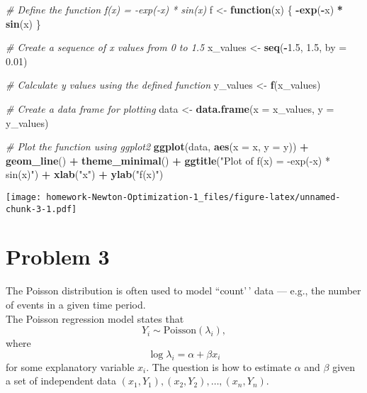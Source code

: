 \documentclass[
]{article}
\newenvironment{Shaded}{\begin{snugshade}}{\end{snugshade}}
\newcommand{\AttributeTok}[1]{\textcolor[rgb]{0.13,0.29,0.53}{#1}}
\newcommand{\CommentTok}[1]{\textcolor[rgb]{0.56,0.35,0.01}{\textit{#1}}}
\newcommand{\ControlFlowTok}[1]{\textcolor[rgb]{0.13,0.29,0.53}{\textbf{#1}}}
\newcommand{\FloatTok}[1]{\textcolor[rgb]{0.00,0.00,0.81}{#1}}
\newcommand{\FunctionTok}[1]{\textcolor[rgb]{0.13,0.29,0.53}{\textbf{#1}}}
\newcommand{\NormalTok}[1]{#1}
\newcommand{\OtherTok}[1]{\textcolor[rgb]{0.56,0.35,0.01}{#1}}
\newcommand{\SpecialCharTok}[1]{\textcolor[rgb]{0.81,0.36,0.00}{\textbf{#1}}}
\newcommand{\StringTok}[1]{\textcolor[rgb]{0.31,0.60,0.02}{#1}}
\begin{document}
\begin{Shaded}
\begin{Highlighting}[]
\CommentTok{\# Define the function f(x) = {-}exp({-}x) * sin(x)}
\NormalTok{f }\OtherTok{\textless{}{-}} \ControlFlowTok{function}\NormalTok{(x) \{}
  \SpecialCharTok{{-}}\FunctionTok{exp}\NormalTok{(}\SpecialCharTok{{-}}\NormalTok{x) }\SpecialCharTok{*} \FunctionTok{sin}\NormalTok{(x)}
\NormalTok{\}}

\CommentTok{\# Create a sequence of x values from 0 to 1.5}
\NormalTok{x\_values }\OtherTok{\textless{}{-}} \FunctionTok{seq}\NormalTok{(}\SpecialCharTok{{-}}\FloatTok{1.5}\NormalTok{, }\FloatTok{1.5}\NormalTok{, }\AttributeTok{by =} \FloatTok{0.01}\NormalTok{)}

\CommentTok{\# Calculate y values using the defined function}
\NormalTok{y\_values }\OtherTok{\textless{}{-}} \FunctionTok{f}\NormalTok{(x\_values)}

\CommentTok{\# Create a data frame for plotting}
\NormalTok{data }\OtherTok{\textless{}{-}} \FunctionTok{data.frame}\NormalTok{(}\AttributeTok{x =}\NormalTok{ x\_values, }\AttributeTok{y =}\NormalTok{ y\_values)}

\CommentTok{\# Plot the function using ggplot2}
\FunctionTok{ggplot}\NormalTok{(data, }\FunctionTok{aes}\NormalTok{(}\AttributeTok{x =}\NormalTok{ x, }\AttributeTok{y =}\NormalTok{ y)) }\SpecialCharTok{+}
  \FunctionTok{geom\_line}\NormalTok{() }\SpecialCharTok{+} 
  \FunctionTok{theme\_minimal}\NormalTok{() }\SpecialCharTok{+}
  \FunctionTok{ggtitle}\NormalTok{(}\StringTok{"Plot of f(x) = {-}exp({-}x) * sin(x)"}\NormalTok{) }\SpecialCharTok{+}
  \FunctionTok{xlab}\NormalTok{(}\StringTok{"x"}\NormalTok{) }\SpecialCharTok{+}
  \FunctionTok{ylab}\NormalTok{(}\StringTok{"f(x)"}\NormalTok{)}
\end{Highlighting}
\end{Shaded}

\texttt{[image: homework-Newton-Optimization-1\_files/figure-latex/unnamed-chunk-3-1.pdf]}

\hypertarget{problem-3}{%
\section{Problem 3}\label{problem-3}}

The Poisson distribution is often used to model ``count'\,' data ---
e.g., the number of events in a given time period.\\
The Poisson regression model states that
\[Y_i \sim \textrm{Poisson}(\lambda_i),\] where
\[\log \lambda_i = \alpha + \beta x_i \] for some explanatory variable
\(x_i\). The question is how to estimate \(\alpha\) and \(\beta\) given
a set of independent data
\((x_1, Y_1), (x_2, Y_2), \ldots, (x_n, Y_n)\).
\end{document}
